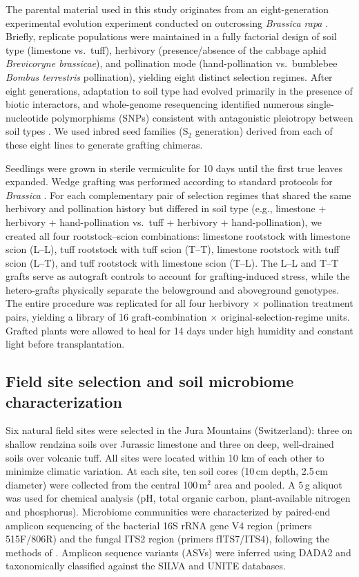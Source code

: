 \documentclass{article}
\begin{document}
The parental material used in this study originates from an eight-generation experimental evolution experiment conducted on outcrossing \textit{Brassica rapa} \cite{zuber2023biotic}. Briefly, replicate populations were maintained in a fully factorial design of soil type (limestone vs.~tuff), herbivory (presence/absence of the cabbage aphid \textit{Brevicoryne brassicae}), and pollination mode (hand-pollination vs.~bumblebee \textit{Bombus terrestris} pollination), yielding eight distinct selection regimes. After eight generations, adaptation to soil type had evolved primarily in the presence of biotic interactors, and whole-genome resequencing identified numerous single-nucleotide polymorphisms (SNPs) consistent with antagonistic pleiotropy between soil types \cite{zuber2023biotic}. We used inbred seed families (S\(_2\) generation) derived from each of these eight lines to generate grafting chimeras.

Seedlings were grown in sterile vermiculite for 10 days until the first true leaves expanded. Wedge grafting was performed according to standard protocols for \textit{Brassica} \cite{turnbull1998grafting}. For each complementary pair of selection regimes that shared the same herbivory and pollination history but differed in soil type (e.g., limestone + herbivory + hand-pollination vs.~tuff + herbivory + hand-pollination), we created all four rootstock–scion combinations: limestone rootstock with limestone scion (L–L), tuff rootstock with tuff scion (T–T), limestone rootstock with tuff scion (L–T), and tuff rootstock with limestone scion (T–L). The L–L and T–T grafts serve as autograft controls to account for grafting-induced stress, while the hetero-grafts physically separate the belowground and aboveground genotypes. The entire procedure was replicated for all four herbivory $\times$ pollination treatment pairs, yielding a library of 16 graft-combination $\times$ original-selection-regime units. Grafted plants were allowed to heal for 14 days under high humidity and constant light before transplantation.

\subsection{Field site selection and soil microbiome characterization}

Six natural field sites were selected in the Jura Mountains (Switzerland): three on shallow rendzina soils over Jurassic limestone and three on deep, well-drained soils over volcanic tuff. All sites were located within 10 km of each other to minimize climatic variation. At each site, ten soil cores (10\,cm depth, 2.5\,cm diameter) were collected from the central 100\,m\(^2\) area and pooled. A 5\,g aliquot was used for chemical analysis (pH, total organic carbon, plant-available nitrogen and phosphorus). Microbiome communities were characterized by paired-end amplicon sequencing of the bacterial 16S rRNA gene V4 region (primers 515F/806R) and the fungal ITS2 region (primers fITS7/ITS4), following the methods of \cite{caporaso2010qiime}. Amplicon sequence variants (ASVs) were inferred using DADA2 \cite{callahan2016dada2} and taxonomically classified against the SILVA and UNITE databases.
\end{document}
